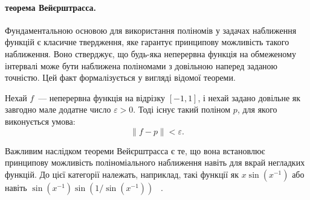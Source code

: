\paragraph{теорема Вейєрштрасса.} Фундаментальною основою для використання поліномів у задачах наближення функцій є класичне твердження, яке гарантує принципову можливість такого наближення. Воно стверджує, що будь-яка неперервна функція на обмеженому інтервалі може бути наближена поліномами з довільною наперед заданою точністю. Цей факт формалізується у вигляді відомої теореми\cite{trefethen2013approximation}.

\begin{statement}
	\label{st:weierstrass}
	Нехай $f$~--- неперервна функція на відрізку $[-1, 1]$, і нехай задано довільне як завгодно мале додатне число $\varepsilon > 0$. Тоді існує такий поліном $p$, для якого виконується умова:
	\begin{equation}\label{eq:weierstrass_condition}
		\|f - p\| < \varepsilon.
	\end{equation}
\end{statement}

Важливим наслідком теореми Вейєрштрасса є те, що вона встановлює принципову можливість поліноміального наближення навіть для вкрай негладких функцій. До цієї категорії належать, наприклад, такі функції як $x \sin(x^{-1})$ або навіть $\sin(x^{-1})\sin(1/\sin(x^{-1}))$ ~\cite{trefethen2013approximation}.